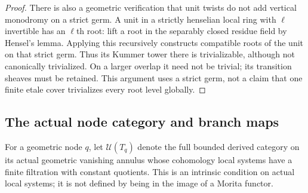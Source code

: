 \documentclass[11pt]{article}
\theoremstyle{definition}
\theoremstyle{remark}
\begin{document}
\begin{proof}
There is also a geometric verification that unit twists do not add
vertical monodromy on a strict germ.  A unit in a strictly henselian
local ring with $\ell$ invertible has an $\ell$th root: lift a root
in the separably closed residue field by Hensel's lemma.  Applying
this recursively constructs compatible roots of the unit on that
strict germ.  Thus its Kummer tower there is trivializable, although
not canonically trivialized.  On a larger overlap it need not be
trivial; its transition sheaves must be retained.  This argument
uses a strict germ, not a claim that one finite etale cover
trivializes every root level globally.
\end{proof}

\subsection{The actual node category and branch maps}
For a geometric node $q$, let $\mathcal U(T_q)$ denote the full
bounded derived category on its actual geometric vanishing annulus
whose cohomology local systems have a finite filtration with constant
quotients.  This is an intrinsic condition on actual local systems;
it is not defined by being in the image of a Morita functor.
\end{document}
